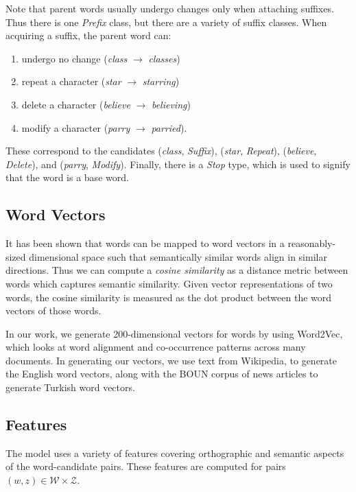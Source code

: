 \documentclass[11pt,twocolumn]{article}
\begin{document}
Note that parent words usually undergo changes only when attaching suffixes. Thus there is one \emph{Prefix} class, but there are a variety of suffix classes. When acquiring a suffix, the parent word can:
\begin{enumerate}
    \item undergo no change (\emph{class} $\rightarrow$ \emph{classes})
    \item repeat a character (\emph{star} $\rightarrow$ \emph{starring})
    \item delete a character (\emph{believe} $\rightarrow$ \emph{believing})
    \item modify a character (\emph{parry} $\rightarrow$ \emph{parried}).
\end{enumerate}
These correspond to the candidates (\emph{class}, \emph{Suffix}), (\emph{star}, \emph{Repeat}), (\emph{believe}, \emph{Delete}), and (\emph{parry}, \emph{Modify}). Finally, there is a \emph{Stop} type, which is used to signify that the word is a base word.

\subsection{Word Vectors}

It has been shown that words can be mapped to word vectors in a reasonably-sized dimensional space such that semantically similar words align in similar directions. Thus we can compute a \emph{cosine similarity} as a distance metric between words which captures semantic similarity. Given vector representations of two words, the cosine similarity is measured as the dot product between the word vectors of those words.

In our work, we generate 200-dimensional vectors for words by using Word2Vec, which looks at word alignment  and co-occurrence patterns across many documents. In generating our vectors, we use text from Wikipedia,
to generate the English word vectors, along with the BOUN corpus of news articles to generate Turkish word vectors.

\subsection{Features}

The model uses a variety of features covering orthographic and semantic aspects of the word-candidate pairs. These features are computed for pairs $(w,z) \in \mathcal W \times \mathcal Z$.
\end{document}
